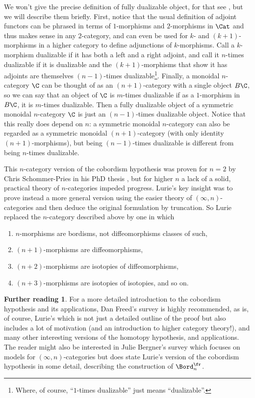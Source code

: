 \documentclass[12pt]{amsart}
\theoremstyle{definition} \newtheorem{definition}[theorem]{Definition}
\newtheorem*{further}{Further reading}
\numberwithin{equation}{section}
\newcommand{\oo}{\infty}
\begin{document}
We won't give the precise definition of fully dualizable object, for
that see \cite[Section 2.3]{LurieCob}, but we will describe them
briefly. First, notice that the usual definition of adjoint functors
can be phrased in terms of $1$-morphisms and $2$-morphisms in $\Cat$
and thus makes sense in any $2$-category, and can even be used for
$k$- and $(k+1)$-morphisms in a higher category to define adjunctions
of $k$-morphisms. Call a $k$-morphism dualizable if it has both a left
and a right adjoint, and call it $n$-times dualizable if it is
dualizable and the $(k+1)$-morphisms that show it has adjoints are
themselves $(n-1)$-times dualizable\footnote{Where, of course,
  ``$1$-times dualizable'' just means ``dualizable''.}. Finally, a
monoidal $n$-category $\C$ can be thought of as an $(n+1)$-category
with a single object $B\C$, so we can say that an object of $\C$ is
$m$-times dualizable if as a $1$-morphism in $B\C$, it is $m$-times
dualizable. Then a fully dualizable object of a symmetric monoidal
$n$-category $\C$ is just an $(n-1)$-times dualizable object. Notice
that this really does depend on $n$: a symmetric monoidal $n$-category
can also be regarded as a symmetric monoidal $(n+1)$-category (with
only identity $(n+1)$-morphisms), but being $(n-1)$-times dualizable
is different from being $n$-times dualizable.

This $n$-category version of the cobordism hypothesis was proven for
$n=2$ by Chris Schommer-Pries in his PhD thesis \cite{S-PTQFT}, but
for higher $n$ a lack of a solid, practical theory of $n$-categories
impeded progress. Lurie's key insight was to prove instead a more general
version using the easier theory of $(\oo,n)$-categories and then
deduce the original formulation by truncation. So Lurie replaced the
$n$-category described above by one in which
\begin{enumerate}
  \item $n$-morphisms are bordisms, not diffeomorphisms classes of such,
  \item $(n+1)$-morphisms are diffeomorphisms,
  \item $(n+2)$-morphisms are isotopies of diffeomorphisms,
  \item $(n+3)$-morphisms are isotopies of isotopies, and so on.
\end{enumerate}

\begin{further}
  For a more detailed introduction to the cobordism hypothesis and its
  applications, Dan Freed's survey \cite{Freed} is highly recommended,
  as is, of course, Lurie's \cite{LurieCob} which is not just a
  detailed outline of the proof but also includes a lot of motivation
  (and an introduction to higher category theory!), and many other
  interesting versions of the homotopy hypothesis, and applications.
  The reader might also be interested in Julie Bergner's survey
  \cite{BergnerCob} which focuses on models for $(\oo,n)$-categories
  but does state Lurie's version of the cobordism hypothesis in some
  detail, describing the construction of $\Bord^{\fr}_n$.
\end{further}

 {}
\end{document}
